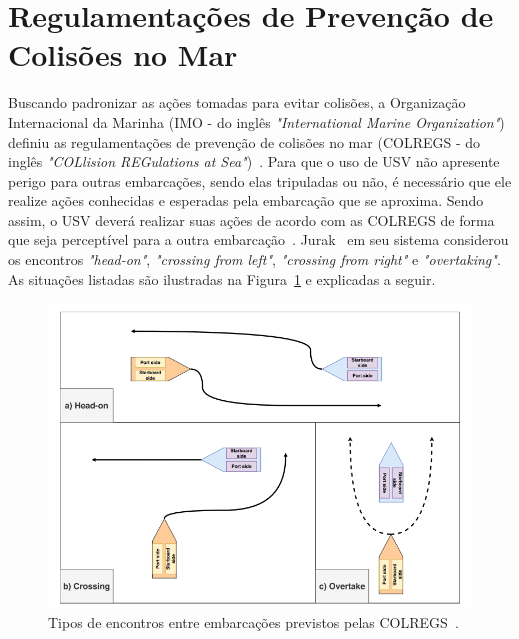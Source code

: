    \section{Regulamentações de Prevenção de Colisões no Mar}\label{subchap2:colregs}
        Buscando padronizar as ações tomadas para evitar colisões, a Organização Internacional da Marinha (IMO - do inglês \textit{"International Marine Organization"}) definiu as regulamentações de prevenção de colisões no mar (COLREGS - do inglês \textit{"COLlision REGulations at Sea"})~\cite{COLREGS}.
        Para que o uso de USV não apresente perigo para outras embarcações, sendo elas tripuladas ou não, é necessário que ele realize ações conhecidas e esperadas pela embarcação que se aproxima. Sendo assim, o USV deverá realizar suas ações de acordo com as COLREGS de forma que seja perceptível para a outra embarcação~\cite{KUWATA2014110}. Jurak~\cite{JURAK2020} em seu sistema considerou os encontros \textit{"head-on"}, \textit{"crossing from left"}, \textit{"crossing from right"} e \textit{"overtaking"}. As situações listadas são ilustradas na Figura~\ref{fig:Jurak2020_colregsSituations} e explicadas a seguir. 
        
        \begin{figure}
            \centering
            \includegraphics[width=\textwidth]{fig/chap2/colregs_situations.png}
            \caption{Tipos de encontros entre embarcações previstos pelas COLREGS~\cite{JURAK2020}.}
            \label{fig:Jurak2020_colregsSituations}
        \end{figure}
        
